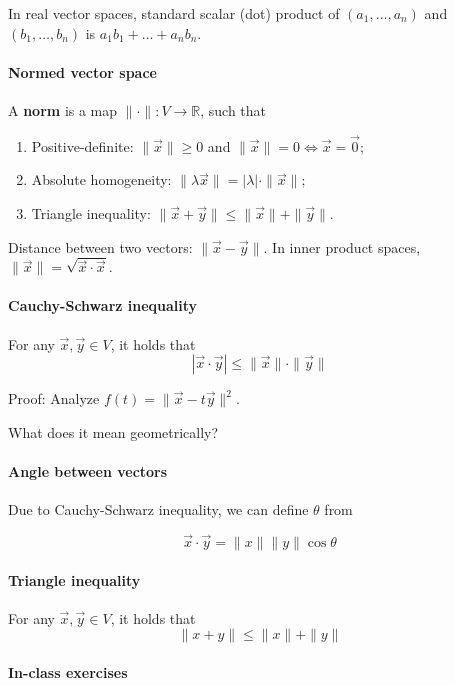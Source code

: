 \documentclass{article}
\begin{document}
In real vector spaces, standard scalar (dot) product of $(a_1,\dots,a_n)$ and $(b_1,\dots,b_n)$ is $a_1 b_1 + \dots + a_n b_n$.

\paragraph{Normed vector space} A \textbf{norm} is a map $\|\cdot \| : V \to \mathbb R$, such that
\begin{enumerate}
    \item Positive-definite: $\|\vec x\| \geq 0$ and $\|\vec x\| = 0 \iff \vec x = \vec 0$;
    \item Absolute homogeneity: $\|\lambda \vec x\| = |\lambda| \cdot \|\vec x\|$;
    \item Triangle inequality: $\|\vec x+\vec y\| \leq \|\vec x\| + \|\vec y\|$.
\end{enumerate}

Distance between two vectors: $\|\vec x - \vec y\|$. In inner product spaces, $\|\vec x\| = \sqrt{\vec x \cdot \vec x}$.

\paragraph{Cauchy-Schwarz inequality} For any $\vec x, \vec y \in V$, it holds that $$|\vec x \cdot \vec y| \leq \|\vec x\| \cdot \|\vec y\|$$

Proof: Analyze $f(t) = \|\vec x - t \vec y \|^2$.

What does it mean geometrically?

\paragraph{Angle between vectors} Due to Cauchy-Schwarz inequality, we can define $\theta$ from

$$
\vec x \cdot \vec y = \|x\| \|y\| \cos \theta
$$

\paragraph{Triangle inequality} For any $\vec x, \vec y \in V$, it holds that $$\|x + y\| \leq \|x\| + \|y\|$$

\paragraph{In-class exercises}
\end{document}
